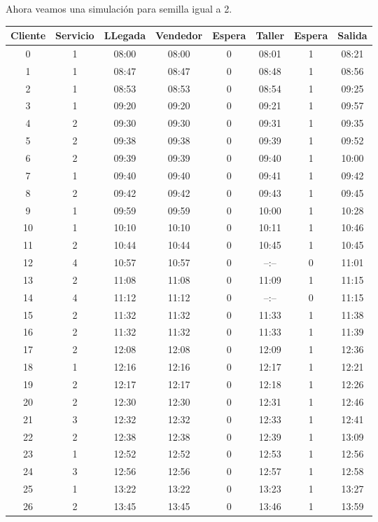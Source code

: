 \documentclass[12pt]{article}
\begin{document}
Ahora veamos una simulaci\'on para semilla igual a 2.\\
\begin{tabular}{|c|c|c|c|c|c|c|c|}
\hline
Cliente & Servicio & LLegada & Vendedor & Espera & Taller & Espera & Salida \\
\hline
0&1 & 08:00 & 08:00 & 0 & 08:01 & 1 & 08:21\\
1&1 & 08:47 & 08:47 & 0 & 08:48 & 1 & 08:56\\
2&1 & 08:53 & 08:53 & 0 & 08:54 & 1 & 09:25\\
3&1 & 09:20 & 09:20 & 0 & 09:21 & 1 & 09:57\\
4&2 & 09:30 & 09:30 & 0 & 09:31 & 1 & 09:35\\
5&2 & 09:38 & 09:38 & 0 & 09:39 & 1 & 09:52\\
6&2 & 09:39 & 09:39 & 0 & 09:40 & 1 & 10:00\\
7&1 & 09:40 & 09:40 & 0 & 09:41 & 1 & 09:42\\
8&2 & 09:42 & 09:42 & 0 & 09:43 & 1 & 09:45\\
9&1 & 09:59 & 09:59 & 0 & 10:00 & 1 & 10:28\\
10&1 & 10:10 & 10:10 & 0 & 10:11 & 1 & 10:46\\
11&2 & 10:44 & 10:44 & 0 & 10:45 & 1 & 10:45\\
12&4 & 10:57 & 10:57 & 0 & --:-- & 0 & 11:01\\
13&2 & 11:08 & 11:08 & 0 & 11:09 & 1 & 11:15\\
14&4 & 11:12 & 11:12 & 0 & --:-- & 0 & 11:15\\
15&2 & 11:32 & 11:32 & 0 & 11:33 & 1 & 11:38\\
16&2 & 11:32 & 11:32 & 0 & 11:33 & 1 & 11:39\\
17&2 & 12:08 & 12:08 & 0 & 12:09 & 1 & 12:36\\
18&1 & 12:16 & 12:16 & 0 & 12:17 & 1 & 12:21\\
19&2 & 12:17 & 12:17 & 0 & 12:18 & 1 & 12:26\\
20&2 & 12:30 & 12:30 & 0 & 12:31 & 1 & 12:46\\
21&3 & 12:32 & 12:32 & 0 & 12:33 & 1 & 12:41\\
22&2 & 12:38 & 12:38 & 0 & 12:39 & 1 & 13:09\\
23&1 & 12:52 & 12:52 & 0 & 12:53 & 1 & 12:56\\
24&3 & 12:56 & 12:56 & 0 & 12:57 & 1 & 12:58\\
25&1 & 13:22 & 13:22 & 0 & 13:23 & 1 & 13:27\\
26&2 & 13:45 & 13:45 & 0 & 13:46 & 1 & 13:59\\

\end{tabular}
\end{document}
